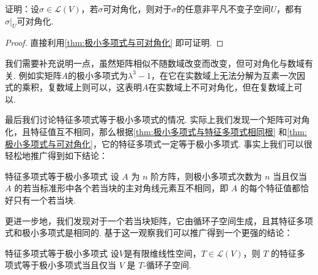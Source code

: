 \begin{example}{}{}
    证明：设$\sigma\in \mathcal{L}(V)$，若$\sigma$可对角化，则对于$\sigma$的任意非平凡不变子空间$U$，都有$\sigma\vert_U$可对角化.
\end{example}

\begin{proof}
    直接利用\autoref{thm:极小多项式与可对角化} 即可证明.
\end{proof}

我们需要补充说明一点，虽然矩阵相似不随数域改变而改变，但可对角化与数域有关. 例如实矩阵$A$的极小多项式为$\lambda^3-1$，在它在实数域上无法分解为互素一次因式的乘积，复数域上则可以，这表明$A$在实数域上不可对角化，但在复数域上可以.

最后我们讨论特征多项式等于极小多项式的情况. 实际上我们发现一个矩阵可对角化，且特征值互不相同，那么根据\autoref{thm:极小多项式与特征多项式相同根} 和\autoref{thm:极小多项式与可对角化}，它的特征多项式一定等于极小多项式. 事实上我们可以很轻松地推广得到如下结论：
\begin{corollary}{}{特征多项式等于极小多项式}
    设 $A$ 为 $n$ 阶方阵，则极小多项式次数为 $n$ 当且仅当 $A$ 的若当标准形中各个若当块的主对角线元素互不相同，即 $A$ 的每个特征值都恰好只有一个若当块.
\end{corollary}

更进一步地，我们发现对于一个若当块矩阵，它由循环子空间生成，且其特征多项式和极小多项式是相同的. 基于这一观察我们可以推广得到一个更强的结论：

\begin{theorem}{}{特征多项式等于极小多项式}
    设$V$是有限维线性空间，$T \in \mathcal{L}(V)$，则 $T$ 的特征多项式等于极小多项式当且仅当 $V$ 是 $T$-循环子空间.
\end{theorem}

